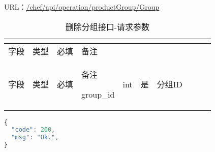 URL：\url{/chef/api/operation/productGroup/Group}


\begin{longtable}{|m{50pt}|m{40pt}|m{50pt}|m{50pt}|}
\tabularnewline\hline
字段&类型&必填&备注
\endhead

\caption{删除分组接口-请求参数}\\
\hline
字段&类型&必填&备注
\endfirsthead

\endfoot

\endlastfoot
\hline
group\_id&int&是&分组ID\\
\hline
\end{longtable}

\begin{lstlisting}[language=JavaScript]
{
  "code": 200,
  "msg": "Ok.",
}
\end{lstlisting}


